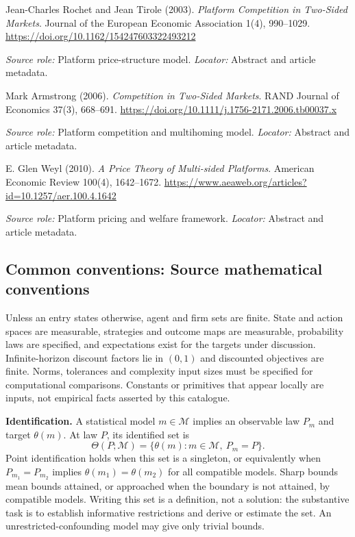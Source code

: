 \documentclass[11pt,a4paper]{article}
\begin{document}
\begin{enumerate}[label={[S\arabic*]},leftmargin=*]

\item Jean-Charles Rochet and Jean Tirole (2003). \emph{Platform Competition in Two-Sided Markets}. Journal of the European Economic Association 1(4), 990--1029. \url{https://doi.org/10.1162/154247603322493212}\par \textit{Source role:} Platform price-structure model. \textit{Locator:} Abstract and article metadata.

\item Mark Armstrong (2006). \emph{Competition in Two-Sided Markets}. RAND Journal of Economics 37(3), 668--691. \url{https://doi.org/10.1111/j.1756-2171.2006.tb00037.x}\par \textit{Source role:} Platform competition and multihoming model. \textit{Locator:} Abstract and article metadata.

\item E. Glen Weyl (2010). \emph{A Price Theory of Multi-sided Platforms}. American Economic Review 100(4), 1642--1672. \url{https://www.aeaweb.org/articles?id=10.1257/aer.100.4.1642}\par \textit{Source role:} Platform pricing and welfare framework. \textit{Locator:} Abstract and article metadata.

\end{enumerate}

\subsection*{Common conventions: Source mathematical conventions}

Unless an entry states otherwise, agent and firm sets are finite. State and action spaces are measurable, strategies and outcome maps are measurable, probability laws are specified, and expectations exist for the targets under discussion. Infinite-horizon discount factors lie in $(0,1)$ and discounted objectives are finite. Norms, tolerances and complexity input sizes must be specified for computational comparisons. Constants or primitives that appear locally are inputs, not empirical facts asserted by this catalogue.

\textbf{Identification.} A statistical model $m\in\mathcal M$ implies an observable law $P_m$ and target $\theta(m)$. At law $P$, its identified set is
\[
\Theta(P;\mathcal M)=\{\theta(m):m\in\mathcal M,\ P_m=P\}.
\]
Point identification holds when this set is a singleton, or equivalently when $P_{m_1}=P_{m_2}$ implies $\theta(m_1)=\theta(m_2)$ for all compatible models. Sharp bounds mean bounds attained, or approached when the boundary is not attained, by compatible models. Writing this set is a definition, not a solution: the substantive task is to establish informative restrictions and derive or estimate the set. An unrestricted-confounding model may give only trivial bounds.
\end{document}
